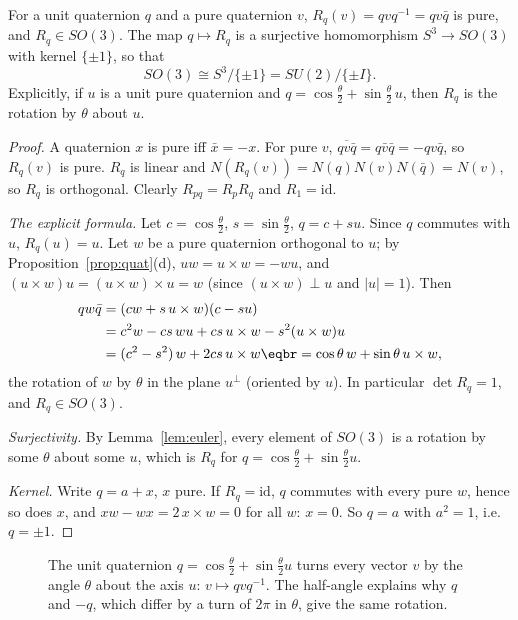 \begin{theorem}\label{thm:su2so3}
For a unit quaternion $q$ and a pure quaternion $v$, $R_q(v)=qvq^{-1}=qv\bar q$ is pure, and $R_q\in SO(3)$. The map $q\mapsto R_q$ is a surjective homomorphism $S^3\to SO(3)$ with kernel $\{\pm1\}$, so that
\[
SO(3)\cong S^3/\{\pm1\}=SU(2)/\{\pm I\}.
\]
Explicitly, if $u$ is a unit pure quaternion and $q=\cos\frac\theta2+\sin\frac\theta2\,u$, then $R_q$ is the rotation by $\theta$ about $u$.
\end{theorem}
\begin{proof}
A quaternion $x$ is pure iff $\bar x=-x$. For pure $v$, $\overline{qv\bar q}=q\bar v\bar q=-qv\bar q$, so $R_q(v)$ is pure. $R_q$ is linear and $N(R_q(v))=N(q)N(v)N(\bar q)=N(v)$, so $R_q$ is orthogonal. Clearly $R_{pq}=R_pR_q$ and $R_1=\mathrm{id}$.

\emph{The explicit formula.} Let $c=\cos\frac\theta2$, $s=\sin\frac\theta2$, $q=c+su$. Since $q$ commutes with $u$, $R_q(u)=u$. Let $w$ be a pure quaternion orthogonal to $u$; by Proposition~\ref{prop:quat}(d), $uw=u\times w=-wu$, and $(u\times w)u=(u\times w)\times u=w$ (since $(u\times w)\perp u$ and $|u|=1$). Then
\[
\begin{aligned}
qw\bar q&=(cw+s\,u\times w)(c-su)\\
&=c^2w-cs\,wu+cs\,u\times w-s^2(u\times w)u\\
&=(c^2-s^2)\,w+2cs\,u\times w\eqbr=\cos\theta\,w+\sin\theta\,u\times w,
\end{aligned}
\]
the rotation of $w$ by $\theta$ in the plane $u^\perp$ (oriented by $u$). In particular $\det R_q=1$, and $R_q\in SO(3)$.

\emph{Surjectivity.} By Lemma~\ref{lem:euler}, every element of $SO(3)$ is a rotation by some $\theta$ about some $u$, which is $R_q$ for $q=\cos\frac\theta2+\sin\frac\theta2u$.

\emph{Kernel.} Write $q=a+x$, $x$ pure. If $R_q=\mathrm{id}$, $q$ commutes with every pure $w$, hence so does $x$, and $xw-wx=2\,x\times w=0$ for all $w$: $x=0$. So $q=a$ with $a^2=1$, i.e.\ $q=\pm1$.
\end{proof}

\begin{figure}[ht]
\centering
{}
\caption{The unit quaternion $q=\cos\frac\theta2+\sin\frac\theta2u$ turns every vector $v$ by the angle $\theta$ about the axis $u$: $v\mapsto qvq^{-1}$. The half-angle explains why $q$ and $-q$, which differ by a turn of $2\pi$ in $\theta$, give the same rotation.}
\label{fig:rotation}
\end{figure}

